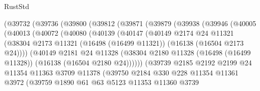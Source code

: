 \begin{lexlean}{RustStd}
\begin{coremodule}
              (@39732
                (@39736
                  (@39800
                    (@39812
                      (@39871
                        (@39879
                          (@39938
                            (@39946
                              (@40005
                                (@40013
                                  (@40072
                                    (@40080
                                      (@40139
                                        (@40147
                                          (@40149
                                            @2174
                                            @24
                                            @11321
                                            (@38304
                                              @2173
                                              @11321
                                              (@16498 (@16499 @11321))
                                              (@16138 (@16504 @2173 @24))))
                                          (@40149
                                            @2181
                                            @24
                                            @11328
                                            (@38304
                                              @2180
                                              @11328
                                              (@16498 (@16499 @11328))
                                              (@16138 (@16504 @2180 @24))))))
                                      (@39739
                                        @2185
                                        @2192
                                        @2199
                                        @24
                                        @11354
                                        @11363
                                        @3709
                                        @11378
                                        (@39750
                                          @2184
                                          @330
                                          @228
                                          @11354
                                          @11361
                                          @3972
                                          (@39759
                                            @1890
                                            @61
                                            @63
                                            @5123
                                            @11353
                                            @11360
                                            @3739

\end{coremodule}
\end{lexlean}
